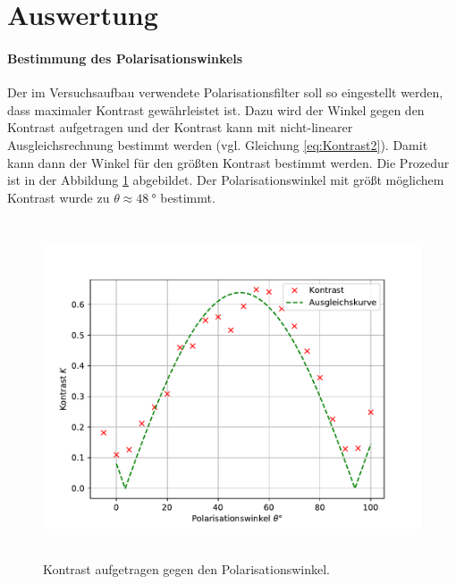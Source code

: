 \section{Auswertung}
\label{sec:Auswertung}
\paragraph{Bestimmung des Polarisationswinkels}
Der im Versuchsaufbau verwendete Polarisationsfilter soll so eingestellt werden, dass maximaler Kontrast 
gewährleistet ist. Dazu wird der Winkel gegen den Kontrast aufgetragen und der Kontrast kann mit nicht-linearer 
Ausgleichsrechnung bestimmt werden (vgl. Gleichung \eqref{eq:Kontrast2}). 
Damit kann dann der Winkel für den größten Kontrast bestimmt werden. Die 
Prozedur ist in der Abbildung \ref{fig:K} abgebildet. Der Polarisationswinkel mit größt möglichem Kontrast 
wurde zu $\theta \approx \SI{48}{\degree}$ bestimmt.
\begin{figure}
  \centering
  \includegraphics[height = 10cm]{plots/Kontrastfit.pdf}
  \caption{Kontrast aufgetragen gegen den Polarisationswinkel.}
  \label{fig:K}
\end{figure}
\FloatBarrier

